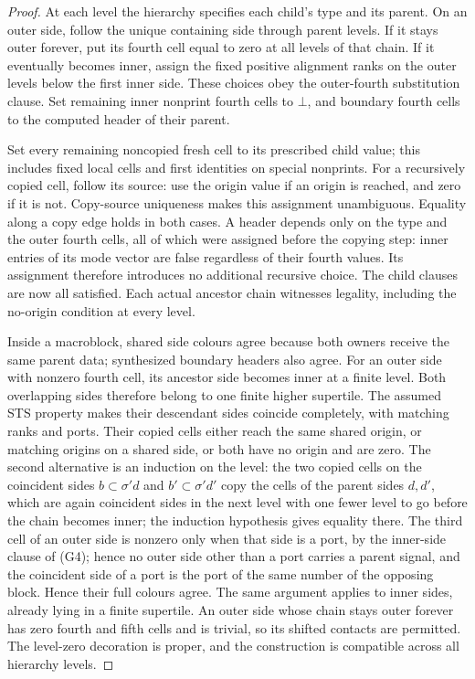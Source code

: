 \documentclass[11pt,a4paper]{article}
\theoremstyle{remark}
\begin{document}
\begin{proof}
At each level the hierarchy specifies each child's type and its parent.
On an outer side, follow the unique containing side through parent levels.
If it stays outer forever, put its fourth cell equal to zero at all levels
of that chain. If it eventually becomes inner, assign the fixed positive
alignment ranks on the outer levels below the first inner side. These
choices obey the outer-fourth substitution clause. Set remaining inner nonprint
fourth cells to $\bot$, and boundary fourth cells to the computed header
of their parent.

Set every remaining noncopied fresh cell to its prescribed child value;
this includes fixed local cells and first identities on special nonprints.
For a recursively copied cell, follow its source: use the origin value if an origin is reached, and
zero if it is not. Copy-source uniqueness makes this assignment
unambiguous. Equality along a copy edge holds in both cases. A header depends
only on the type and the outer fourth cells, all of which were assigned
before the copying step: inner entries of its mode vector are false regardless
of their fourth values. Its assignment therefore introduces no additional
recursive choice. The child clauses are now
all satisfied. Each actual ancestor chain witnesses legality, including
the no-origin condition at every level.

Inside a macroblock, shared side colours agree because both owners receive
the same parent data; synthesized boundary headers also agree. For an outer
side with nonzero fourth cell, its ancestor side becomes inner at a finite
level. Both overlapping sides therefore belong to one finite higher
supertile. The assumed STS property makes their descendant sides coincide
completely, with matching ranks and ports. Their copied cells either reach
the same shared origin, or matching origins on a shared side, or both have
no origin and are zero. The second alternative is an induction on the
level: the two copied cells on the coincident sides $b\subset\sigma'd$ and
$b'\subset\sigma'd'$ copy the cells of the parent sides $d,d'$, which are
again coincident sides in the next level with one fewer level to go before
the chain becomes inner; the induction hypothesis gives equality there.
The third cell of an outer side is nonzero only when that side is a port,
by the inner-side clause of (G4); hence no outer side other than a port
carries a parent signal, and the coincident side of a port is the port of
the same number of the opposing block. Hence their full colours agree. The same argument
applies to inner sides, already lying in a finite supertile. An outer side
whose chain stays outer forever has zero fourth and fifth cells and is
trivial, so its shifted contacts are permitted. The level-zero decoration
is proper, and the construction is compatible across all hierarchy levels.
\end{proof}
\end{document}
